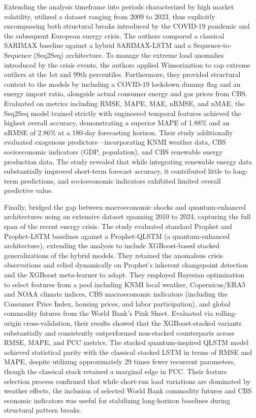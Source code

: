 Extending the analysis timeframe into periods characterized by high market volatility, \cite{ashtar_hybrid_2025} utilized a dataset ranging from 2009 to 2023, thus explicitly encompassing both structural breaks introduced by the COVID-19 pandemic and the subsequent European energy crisis. The authors compared a classical SARIMAX baseline against a hybrid SARIMAX-LSTM and a Sequence-to-Sequence (Seq2Seq) architecture. To manage the extreme load anomalies introduced by the crisis events, the authors applied Winsorization to cap extreme outliers at the 1st and 99th percentiles. Furthermore, they provided structural context to the models by including a COVID-19 lockdown dummy flag and an energy import ratio, alongside actual consumer energy and gas prices from CBS. Evaluated on metrics including RMSE, MAPE, MAE, nRMSE, and nMAE, the Seq2Seq model trained strictly with engineered temporal features achieved the highest overall accuracy, demonstrating a superior MAPE of 1.88\% and an nRMSE of 2.86\% at a 180-day forecasting horizon. Their study additionally evaluated exogenous predictors—incorporating KNMI weather data, CBS socioeconomic indicators (GDP, population), and CBS renewable energy production data. The study revealed that while integrating renewable energy data substantially improved short-term forecast accuracy, it contributed little to long-term predictions, and socioeconomic indicators exhibited limited overall predictive value.

Finally, \cite{curiel_integrating_2025} bridged the gap between macroeconomic shocks and quantum-enhanced architectures using an extensive dataset spanning 2010 to 2024, capturing the full span of the recent energy crisis. The study evaluated standard Prophet and Prophet-LSTM baselines against a Prophet-QLSTM (a quantum-enhanced architecture), extending the analysis to include XGBoost-based stacked generalizations of the hybrid models. They retained the anomalous crisis observations and relied dynamically on Prophet's inherent changepoint detection and the XGBoost meta-learner to adapt. They employed Bayesian optimization to select features from a pool including KNMI local weather, Copernicus/ERA5 and NOAA climate indices, CBS macroeconomic indicators (including the Consumer Price Index, housing prices, and labor participation), and global commodity futures from the World Bank's Pink Sheet. Evaluated via rolling-origin cross-validation, their results showed that the XGBoost-stacked variants substantially and consistently outperformed non-stacked counterparts across RMSE, MAPE, and PCC metrics. The stacked quantum-inspired QLSTM model achieved statistical parity with the classical stacked LSTM in terms of RMSE and MAPE, despite utilizing approximately 29 times fewer recurrent parameters, though the classical stack retained a marginal edge in PCC. Their feature selection process confirmed that while short-run load variations are dominated by weather effects, the inclusion of selected World Bank commodity futures and CBS economic indicators was useful for stabilizing long-horizon baselines during structural pattern breaks.

